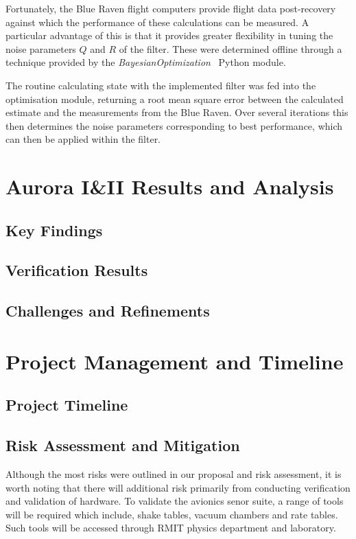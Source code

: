 Fortunately, the Blue Raven flight computers provide flight data post-recovery against which the performance of these calculations can be measured. A particular advantage of this is that it provides greater flexibility in tuning the noise parameters $Q$ and $R$ of the filter. These were determined offline through a technique provided by the \textit{BayesianOptimization}~\cite{Bayesian2014} Python module. 

The routine calculating state with the implemented filter was fed into the optimisation module, returning a root mean square error between the calculated estimate and the measurements from the Blue Raven. Over several iterations this then determines the noise parameters corresponding to best performance, which can then be applied within the filter.

\section{Aurora I\&II Results and Analysis}
\subsection{Key Findings}
\subsection{Verification Results}
\subsection{Challenges and Refinements}

\section{Project Management and Timeline}
\subsection{Project Timeline}

\subsection{Risk Assessment and Mitigation}
Although the most risks were outlined in our proposal and risk assessment, it is worth noting that there will additional risk primarily from conducting verification and validation of hardware. To validate the avionics senor suite, a range of tools will be required which include, shake tables, vacuum chambers and rate tables. Such tools will be accessed through RMIT physics department and laboratory. 

